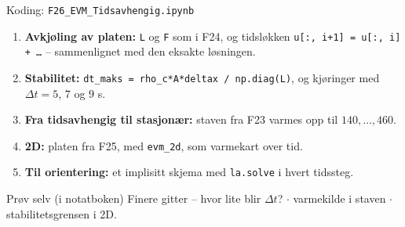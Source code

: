 \documentclass[11pt,aspectratio=169]{beamer}
\begin{document}
\begin{frame}{Koding: \texttt{F26\_EVM\_Tidsavhengig.ipynb}}
\begin{enumerate}
\item \textbf{Avkjøling av platen:} \texttt{L} og \texttt{F} som i F24, og tidsløkken \texttt{u[:, i+1] = u[:, i] + \ldots} -- sammenlignet med den eksakte løsningen.
\item \textbf{Stabilitet:} \texttt{dt\_maks = rho\_c*A*deltax / np.diag(L)}, og kjøringer med $\Delta t = 5$, $7$ og $9$ s.
\item \textbf{Fra tidsavhengig til stasjonær:} staven fra F23 varmes opp til $140, \ldots, 460$.
\item \textbf{2D:} platen fra F25, med \texttt{evm\_2d}, som varmekart over tid.
\item \textbf{Til orientering:} et implisitt skjema med \texttt{la.solve} i hvert tidssteg.
\end{enumerate}
\begin{remb}{Prøv selv (i notatboken)}
Finere gitter -- hvor lite blir $\Delta t$? \;$\cdot$\; varmekilde i staven \;$\cdot$\; stabilitetsgrensen i 2D.
\end{remb}
\end{frame}
\end{document}
